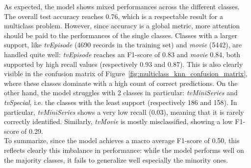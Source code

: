 As expected, the model shows mixed performances across the different classes. 
The overall test accuracy reaches 0.76, which is a respectable result for a multiclass problem. 
However, since accuracy is a global metric, more attention should be paid to the performances of the single classes. 
Classes with a larger support, like \textit{tvEpisode} (4690 records in the training set) and \textit{movie} (5442), are handled quite well: \textit{tvEpisode} reaches an F1-score of 0.83 and \textit{movie} 0.84, both supported by high recall values (respectively 0.93 and 0.87). 
This is also clearly visible in the confusion matrix of Figure~\ref{fig:multiclass_knn_confusion_matrix}, where these classes dominate with a high count of correct predictions. 
On the other hand, the model struggles with 2 classes in particular: \textit{tvMiniSeries} and \textit{tvSpecial}, i.e. the classes with the least support (respectively 186 and 158). 
In particular, \textit{tvMiniSeries} shows a very low recall (0.03), meaning that it is rarely correctly identified. 
Similarly, \textit{tvMovie} is mostly misclassified, showing a low F1-score of 0.29.\\
To summarize, since the model achieves a macro average F1-score of 0.50, this reflects clearly this imbalance in performance: while the model performs well on the majority classes, it fails to generalize well especially the minority ones.




